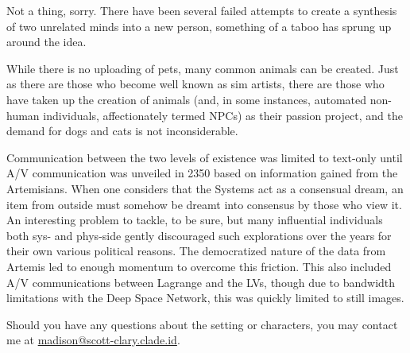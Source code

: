\begin{description}
\tightlist
\item[Children]
Not a thing, sorry. There have been several failed attempts to create a synthesis of two unrelated minds into a new person, something of a taboo has sprung up around the idea.
\item[Pets]
While there is no uploading of pets, many common animals can be created. Just as there are those who become well known as sim artists, there are those who have taken up the creation of animals (and, in some instances, automated non-human individuals, affectionately termed NPCs) as their passion project, and the demand for dogs and cats is not inconsiderable.
\item[Communication between sys-side and phys-side]
Communication between the two levels of existence was limited to text-only until A/V communication was unveiled in 2350 based on information gained from the Artemisians. When one considers that the Systems act as a consensual dream, an item from outside must somehow be dreamt into consensus by those who view it. An interesting problem to tackle, to be sure, but many influential individuals both sys- and phys-side gently discouraged such explorations over the years for their own various political reasons. The democratized nature of the data from Artemis led to enough momentum to overcome this friction. This also included A/V communications between Lagrange and the LVs, though due to bandwidth limitations with the Deep Space Network, this was quickly limited to still images.
\end{description}

\secdiv

\noindent Should you have any questions about the setting or characters, you may contact me at \href{mailto:mscottclary@clade.id}{madison@scott-clary.clade.id}.
